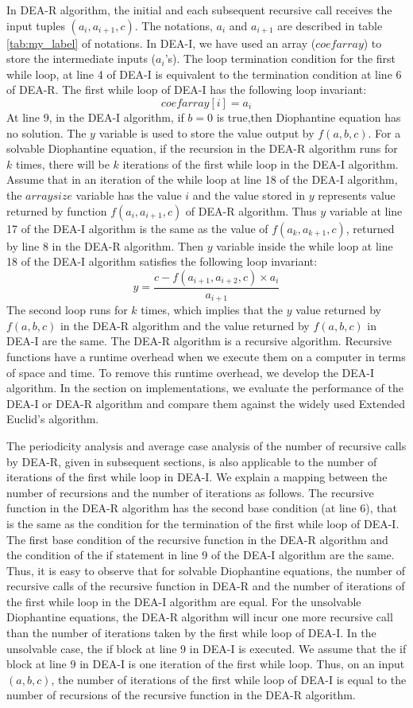 \documentclass[pdflatex,sn-mathphys-num]{sn-jnl}%
\theoremstyle{thmstyleone}%
\theoremstyle{thmstyletwo}%
\theoremstyle{thmstylethree}%
\begin{document}
In DEA-R algorithm, the initial and each subsequent recursive call receives the input tuples $(a_i,a_{i+1},c)$. The notations, $a_i$ and $a_{i+1}$ are described in table \ref{tab:my_label} of notations.
In DEA-I, we have used an array ($coefarray$) to store the intermediate inputs ($a_i$'s). The loop termination condition for the first while loop, at line 4 of DEA-I is equivalent to the termination condition at line 6 of DEA-R. The first while loop of DEA-I has the following loop invariant:
$$
coefarray[i]=a_i
$$
At line 9, in the DEA-I algorithm, if $b=0$ is true,then Diophantine equation has no solution. The $y$ variable is used to store the value output by $f(a,b,c)$.  For a solvable Diophantine equation, if the recursion in the DEA-R algorithm runs for $k$ times, there will be $k$ iterations of the first while loop in the DEA-I algorithm. Assume that in an iteration of the while loop at line 18 of the DEA-I algorithm, the $arraysize$ variable has the value $i$ and the value stored in $y$
represents value returned by function $f(a_i,a_{i+1},c)$ of DEA-R algorithm. Thus $y$ variable at line 17 of the DEA-I algorithm is the same as the value of $f(a_k,a_{k+1},c)$, returned by line 8 in the DEA-R algorithm. Then $y$ variable inside the while loop at line 18 of the DEA-I algorithm satisfies the following loop invariant:
$$
y=\frac{c-f(a_{i+1},a_{i+2},c)\times a_i}{a_{i+1}}
$$
The second loop runs for $k$ times, which implies that the $y$ value returned by $f(a,b,c)$ in the DEA-R algorithm and the value returned by $f(a,b,c)$ in DEA-I are the same.
The DEA-R algorithm is a recursive algorithm. Recursive functions have a runtime overhead when we execute them on a computer in terms of space and time. To remove this runtime overhead, we develop the DEA-I algorithm. In the section on implementations, we evaluate the performance of the DEA-I or DEA-R algorithm and compare them against the widely used Extended Euclid's algorithm.  
\par The periodicity analysis and average case analysis of the number of recursive calls by DEA-R, given in subsequent sections, is also applicable to the number of iterations of the first while loop in DEA-I. We explain a mapping between the number of recursions and the number of iterations as follows. The recursive function in the DEA-R algorithm has the second base condition (at line 6), that is the same as the condition for the termination of the first while loop of DEA-I. The first base condition of the recursive function in the DEA-R algorithm and the condition of the if statement in line 9 of the DEA-I algorithm are the same. Thus, it is easy to observe that for solvable Diophantine equations, the number of recursive calls of the recursive function in DEA-R and the number of iterations of the first while loop in the DEA-I algorithm are equal. For the unsolvable Diophantine equations, the DEA-R algorithm will incur one more recursive call than the number of iterations taken by the first while loop of DEA-I. In the unsolvable case, the if block at line 9 in DEA-I is executed. We assume that the if block at line 9 in DEA-I is one iteration of the first while loop. Thus, on an input $(a,b,c)$, the number of iterations of the first while loop of DEA-I is equal to the number of recursions of the recursive function in the DEA-R algorithm. 
\end{document}
